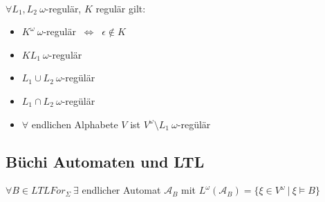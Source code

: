 \documentclass[a4paper,11pt]{scrartcl}
\newcommand{\calA}{\mathcal{A}}
\newcommand{\Lra}{\Leftrightarrow}
\newcommand{\LTLF}{LTLFor_\Sigma}
\newcommand{\gilt}{\vDash}
\newcommand{\Vo}{V^\omega}
\theoremstyle{default}
\begin{document}
\ \\ $\forall L_1, L_2 \ \omega$-regulär, $K$ regulär gilt:
\begin{itemize}
 \item $K^\omega \ \omega$-regulär $\ \Lra \ $ $\epsilon \not \in K$
 \item $K L_1 \ \omega$-regulär
 \item $L_1 \cup L_2 \ \omega$-regülär
 \item $L_1 \cap L_2 \ \omega$-regülär
 \item $\forall$ endlichen Alphabete $V$ ist $\Vo \setminus L_1 \ \omega$-regülär
\end{itemize}

\subsection{Büchi Automaten und LTL}
$\forall B \in \LTLF \ \exists$ endlicher Automat $\calA_B$ mit $L^\omega(\calA_B) = \{ \xi \in \Vo \ | \ \xi \gilt B \}$ \\
\end{document}
